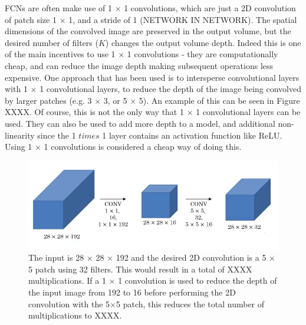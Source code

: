 \documentclass[a4paper]{article}
\begin{document}
FCNs are often make use of 1 $\times$ 1 convolutions, which are just a 2D convolution of patch size 1 $\times$ 1, and a stride of 1 (NETWORK IN NETWORK). The spatial dimensions of the convolved image are preserved in the output volume, but the desired number of filters ($K$) changes the output volume depth. Indeed this is one of the main incentives to use 1 $\times$ 1 convolutions - they are computationally cheap, and can reduce the image depth making subsequent operations less expensive. One approach that has been used is to intersperse convolutional layers with 1 $\times$ 1 convolutional layers, to reduce the depth of the image being convolved by larger patches (e.g. 3 $\times$ 3, or 5 $\times$ 5). An example of this can be seen in Figure XXXX. Of course, this is not the only way that 1 $\times$ 1 convolutional layers can be used. They can also be used to add more depth to a model, and additional non-linearity since the 1 $times$ 1 layer contains an activation function like ReLU. Using 1 $\times$ 1 convolutions is considered a cheap way of doing this.  
\begin{figure}[h]
\centering
\includegraphics[scale=0.4]{1by1}
\caption{The input is 28 $\times$ 28 $\times$ 192 and the desired 2D convolution is a 5 $\times$ 5 patch using 32 filters. This would result in a total of XXXX multiplications. If a 1 $\times$ 1 convolution is used to reduce the depth of the input image from 192 to 16 before performing the 2D convolution with the 5$\times$5 patch, this reduces the total number of multiplications to XXXX.}
\end{figure}
\end{document}
